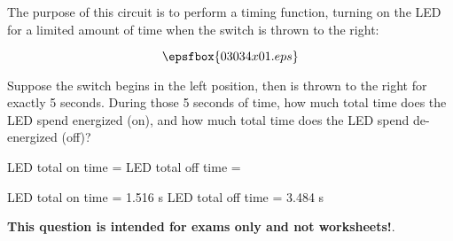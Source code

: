 

The purpose of this circuit is to perform a timing function, turning on the LED for a limited amount of time when the switch is thrown to the right:

$$\epsfbox{03034x01.eps}$$

Suppose the switch begins in the left position, then is thrown to the right for exactly 5 seconds.  During those 5 seconds of time, how much total time does the LED spend energized (on), and how much total time does the LED spend de-energized (off)?

\vskip 10pt

LED total on time = \hskip 100pt LED total off time =







LED total on time = 1.516 s \hskip 100pt LED total off time = 3.484 s







{\bf This question is intended for exams only and not worksheets!}.




